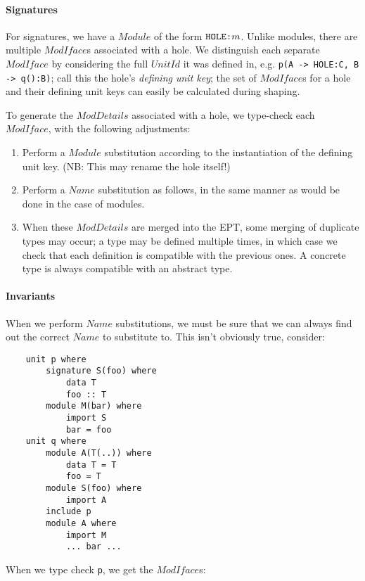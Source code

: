 \documentclass{article}
\newcommand{\I}[1]{\ensuremath{\mathit{#1}}}
\begin{document}
\paragraph{Signatures}  For signatures, we have a \I{Module} of the form
$\verb|HOLE:|m$.  Unlike modules, there are multiple \I{ModIface}s associated with a hole.
We distinguish each separate \I{ModIface} by considering the full \I{UnitId}
it was defined in, e.g. \verb|p(A -> HOLE:C, B -> q():B)|; call this
the hole's \emph{defining unit key}; the set of \I{ModIface}s for a hole
and their defining unit keys can easily be calculated during shaping.

To generate the \I{ModDetails} associated with a hole, we type-check each
\I{ModIface}, with the following adjustments:

\begin{enumerate}
    \item Perform a \I{Module} substitution according to the instantiation
        of the defining unit key.  (NB: This may rename the hole itself!)
    \item Perform a \I{Name} substitution as follows, in the same manner
        as would be done in the case of modules.
    \item When these \I{ModDetails} are merged into the EPT, some merging
        of duplicate types may occur; a type
        may be defined multiple times, in which case we check that each
        definition is compatible with the previous ones.  A concrete
        type is always compatible with an abstract type.
\end{enumerate}

\paragraph{Invariants} When we perform \I{Name} substitutions, we must be
sure that we can always find out the correct \I{Name} to substitute to.
This isn't obviously true, consider:

\begin{verbatim}
    unit p where
        signature S(foo) where
            data T
            foo :: T
        module M(bar) where
            import S
            bar = foo
    unit q where
        module A(T(..)) where
            data T = T
            foo = T
        module S(foo) where
            import A
        include p
        module A where
            import M
            ... bar ...
\end{verbatim}
%
When we type check \verb|p|, we get the \I{ModIface}s:
\end{document}
